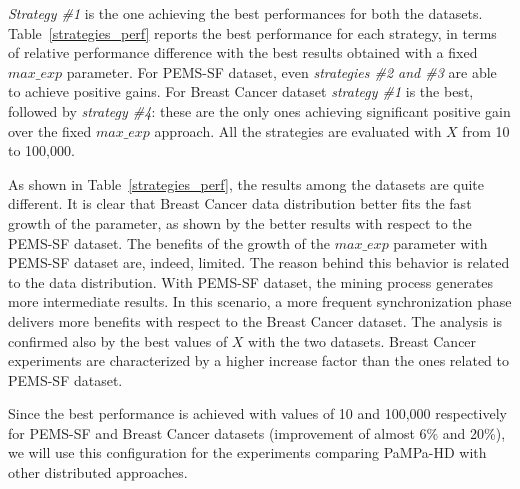\textit{Strategy \#1} is the one achieving the best performances for both the datasets. Table~\ref{strategies_perf} reports the best performance for each strategy, in terms of relative performance difference with the best results obtained with a fixed $max\_exp$ parameter. For PEMS-SF dataset, even \textit{strategies \#2 and \#3} are able to achieve positive gains. For Breast Cancer dataset \textit{strategy \#1} is the best, followed by \textit{strategy \#4}: these are the only ones achieving significant positive gain over the fixed $max\_exp$ approach. All the strategies are evaluated with $X$ from 10 to 100,000.

As shown in Table~\ref{strategies_perf}, the results among the datasets are quite different. It is clear that Breast Cancer data distribution better fits the fast growth of the parameter, as shown by the better results with respect to the PEMS-SF dataset. The benefits of the growth of the $max\_exp$ parameter with PEMS-SF dataset are, indeed, limited.  The reason behind this behavior is related to the data distribution. With PEMS-SF dataset, the mining process generates more intermediate results. In this scenario, a more frequent synchronization phase delivers more benefits with respect to the Breast Cancer dataset.  
The analysis is confirmed also by the best values of $X$ with the two datasets. Breast Cancer experiments are characterized by a higher increase factor than the ones related to PEMS-SF dataset.


Since the best performance is achieved with values of 10 and 100,000 respectively for PEMS-SF and Breast Cancer datasets (improvement of almost 6\% and 20\%), we will use this configuration for the experiments comparing PaMPa-HD with other distributed approaches. 
%




